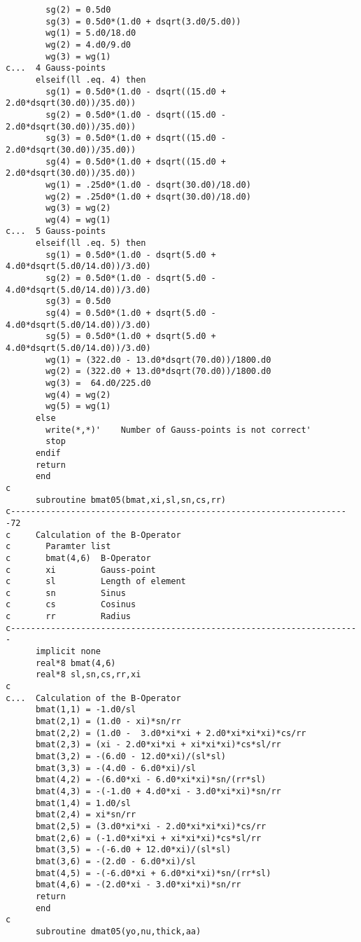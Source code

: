 {\begin{verbatim}
        sg(2) = 0.5d0
        sg(3) = 0.5d0*(1.d0 + dsqrt(3.d0/5.d0))
        wg(1) = 5.d0/18.d0
        wg(2) = 4.d0/9.d0
        wg(3) = wg(1)    
c...  4 Gauss-points
      elseif(ll .eq. 4) then
        sg(1) = 0.5d0*(1.d0 - dsqrt((15.d0 + 2.d0*dsqrt(30.d0))/35.d0))
        sg(2) = 0.5d0*(1.d0 - dsqrt((15.d0 - 2.d0*dsqrt(30.d0))/35.d0))
        sg(3) = 0.5d0*(1.d0 + dsqrt((15.d0 - 2.d0*dsqrt(30.d0))/35.d0))
        sg(4) = 0.5d0*(1.d0 + dsqrt((15.d0 + 2.d0*dsqrt(30.d0))/35.d0))
        wg(1) = .25d0*(1.d0 - dsqrt(30.d0)/18.d0)
        wg(2) = .25d0*(1.d0 + dsqrt(30.d0)/18.d0)
        wg(3) = wg(2)
        wg(4) = wg(1) 
c...  5 Gauss-points
      elseif(ll .eq. 5) then
        sg(1) = 0.5d0*(1.d0 - dsqrt(5.d0 + 4.d0*dsqrt(5.d0/14.d0))/3.d0)
        sg(2) = 0.5d0*(1.d0 - dsqrt(5.d0 - 4.d0*dsqrt(5.d0/14.d0))/3.d0)
        sg(3) = 0.5d0
        sg(4) = 0.5d0*(1.d0 + dsqrt(5.d0 - 4.d0*dsqrt(5.d0/14.d0))/3.d0)
        sg(5) = 0.5d0*(1.d0 + dsqrt(5.d0 + 4.d0*dsqrt(5.d0/14.d0))/3.d0)
        wg(1) = (322.d0 - 13.d0*dsqrt(70.d0))/1800.d0
        wg(2) = (322.d0 + 13.d0*dsqrt(70.d0))/1800.d0
        wg(3) =  64.d0/225.d0
        wg(4) = wg(2)
        wg(5) = wg(1)
      else
        write(*,*)'    Number of Gauss-points is not correct'
        stop
      endif
      return
      end
c
      subroutine bmat05(bmat,xi,sl,sn,cs,rr)
c--------------------------------------------------------------------72
c     Calculation of the B-Operator
c       Paramter list
c       bmat(4,6)  B-Operator
c       xi         Gauss-point
c       sl         Length of element
c       sn         Sinus
c       cs         Cosinus
c       rr         Radius
c----------------------------------------------------------------------
      implicit none
      real*8 bmat(4,6)
      real*8 sl,sn,cs,rr,xi
c
c...  Calculation of the B-Operator
      bmat(1,1) = -1.d0/sl
      bmat(2,1) = (1.d0 - xi)*sn/rr
      bmat(2,2) = (1.d0 -  3.d0*xi*xi + 2.d0*xi*xi*xi)*cs/rr
      bmat(2,3) = (xi - 2.d0*xi*xi + xi*xi*xi)*cs*sl/rr
      bmat(3,2) = -(6.d0 - 12.d0*xi)/(sl*sl)
      bmat(3,3) = -(4.d0 - 6.d0*xi)/sl
      bmat(4,2) = -(6.d0*xi - 6.d0*xi*xi)*sn/(rr*sl)
      bmat(4,3) = -(-1.d0 + 4.d0*xi - 3.d0*xi*xi)*sn/rr
      bmat(1,4) = 1.d0/sl
      bmat(2,4) = xi*sn/rr
      bmat(2,5) = (3.d0*xi*xi - 2.d0*xi*xi*xi)*cs/rr
      bmat(2,6) = (-1.d0*xi*xi + xi*xi*xi)*cs*sl/rr
      bmat(3,5) = -(-6.d0 + 12.d0*xi)/(sl*sl)
      bmat(3,6) = -(2.d0 - 6.d0*xi)/sl
      bmat(4,5) = -(-6.d0*xi + 6.d0*xi*xi)*sn/(rr*sl)
      bmat(4,6) = -(2.d0*xi - 3.d0*xi*xi)*sn/rr
      return
      end
c
      subroutine dmat05(yo,nu,thick,aa)

\end{verbatim}}
